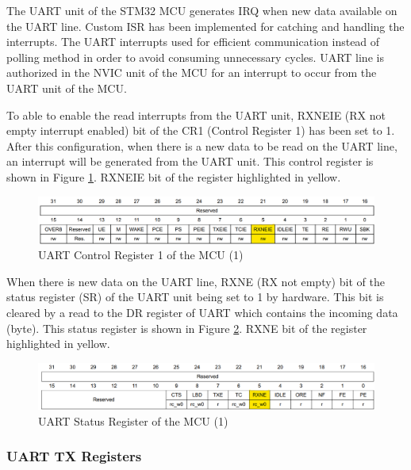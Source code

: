 The UART unit of the STM32 MCU generates IRQ when new data available on the UART line. Custom ISR has been implemented for catching and handling the interrupts. The UART interrupts used for efficient communication instead of polling method in order to avoid consuming unnecessary cycles. UART line is authorized in the NVIC unit of the MCU for an interrupt to occur from the UART unit of the MCU.

To able to enable the read interrupts from the UART unit, RXNEIE (RX not empty interrupt enabled) bit of the CR1 (Control Register 1) has been set to 1. After this configuration, when there is a new data to be read on the UART line, an interrupt will be generated from the UART unit. This control register is shown in Figure \ref{fig:uart_cr_register}. RXNEIE bit of the register highlighted in yellow.

\begin{figure}[!htbp]
    \centering
    \includegraphics[width=1\textwidth]{Imgs/cr_register.png}
    \caption{\label{fig:uart_cr_register}UART Control Register 1 of the MCU (1) \cite{Ref_stm32_um}}
\end{figure}

When there is new data on the UART line, RXNE (RX not empty) bit of the status register (SR) of the UART unit being set to 1 by hardware. This bit is cleared by a read to the DR register of UART which contains the incoming data (byte). This status register is shown in Figure \ref{fig:uart_sr_register}. RXNE bit of the register highlighted in yellow.

\begin{figure}[!htbp]
    \centering
    \includegraphics[width=1\textwidth]{Imgs/sr_register.png}
    \caption{\label{fig:uart_sr_register}UART Status Register of the MCU (1) \cite{Ref_stm32_um}}
\end{figure}


\subsubsection{UART TX Registers}
\label{sec_transmit_rc_info}

